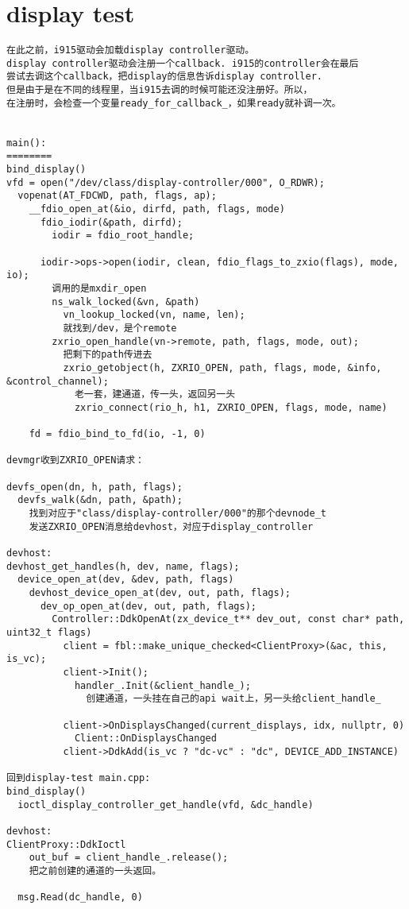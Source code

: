\section{display test}

\begin{verbatim}
在此之前，i915驱动会加载display controller驱动。
display controller驱动会注册一个callback. i915的controller会在最后
尝试去调这个callback，把display的信息告诉display controller.
但是由于是在不同的线程里，当i915去调的时候可能还没注册好。所以，
在注册时，会检查一个变量ready_for_callback_，如果ready就补调一次。


main():
========
bind_display()
vfd = open("/dev/class/display-controller/000", O_RDWR);
  vopenat(AT_FDCWD, path, flags, ap);
    __fdio_open_at(&io, dirfd, path, flags, mode)
      fdio_iodir(&path, dirfd);
        iodir = fdio_root_handle;

      iodir->ops->open(iodir, clean, fdio_flags_to_zxio(flags), mode, io);
        调用的是mxdir_open
        ns_walk_locked(&vn, &path)
          vn_lookup_locked(vn, name, len);
          就找到/dev，是个remote
        zxrio_open_handle(vn->remote, path, flags, mode, out);
          把剩下的path传进去
          zxrio_getobject(h, ZXRIO_OPEN, path, flags, mode, &info, &control_channel);
            老一套，建通道，传一头，返回另一头
            zxrio_connect(rio_h, h1, ZXRIO_OPEN, flags, mode, name)

    fd = fdio_bind_to_fd(io, -1, 0)

devmgr收到ZXRIO_OPEN请求：

devfs_open(dn, h, path, flags);
  devfs_walk(&dn, path, &path);
    找到对应于"class/display-controller/000"的那个devnode_t
    发送ZXRIO_OPEN消息给devhost，对应于display_controller

devhost:
devhost_get_handles(h, dev, name, flags);
  device_open_at(dev, &dev, path, flags)
    devhost_device_open_at(dev, out, path, flags);
      dev_op_open_at(dev, out, path, flags);
        Controller::DdkOpenAt(zx_device_t** dev_out, const char* path, uint32_t flags)
          client = fbl::make_unique_checked<ClientProxy>(&ac, this, is_vc);
          client->Init();
            handler_.Init(&client_handle_);
              创建通道，一头挂在自己的api wait上，另一头给client_handle_

          client->OnDisplaysChanged(current_displays, idx, nullptr, 0)
            Client::OnDisplaysChanged
          client->DdkAdd(is_vc ? "dc-vc" : "dc", DEVICE_ADD_INSTANCE)

回到display-test main.cpp:
bind_display()
  ioctl_display_controller_get_handle(vfd, &dc_handle)

devhost:
ClientProxy::DdkIoctl
    out_buf = client_handle_.release();
    把之前创建的通道的一头返回。

  msg.Read(dc_handle, 0)
\end{verbatim}